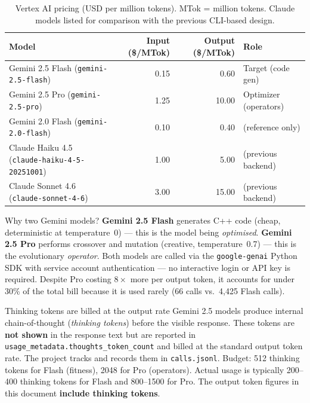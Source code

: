\documentclass[11pt,a4paper]{report}
\begin{document}
\begin{table}[h]
\centering
\begin{tabular}{@{}lrrl@{}}
\toprule
\textbf{Model} & {\textbf{Input (\$/MTok)}} & {\textbf{Output (\$/MTok)}} & \textbf{Role} \\
\midrule
Gemini 2.5 Flash (\texttt{gemini-2.5-flash}) & 0.15  & 0.60  & Target (code gen) \\
Gemini 2.5 Pro   (\texttt{gemini-2.5-pro})   & 1.25  & 10.00 & Optimizer (operators) \\
Gemini 2.0 Flash (\texttt{gemini-2.0-flash}) & 0.10  & 0.40  & (reference only) \\
\midrule
Claude Haiku 4.5 (\texttt{claude-haiku-4-5-20251001}) & 1.00 & 5.00 & (previous backend) \\
Claude Sonnet 4.6 (\texttt{claude-sonnet-4-6})         & 3.00 & 15.00 & (previous backend) \\
\bottomrule
\end{tabular}
\caption{Vertex AI pricing (USD per million tokens). MTok = million tokens.
         Claude models listed for comparison with the previous CLI-based design.}
\label{tab:standard-pricing}
\end{table}

\begin{conceptbox}{Why two Gemini models?}
\textbf{Gemini 2.5 Flash} generates C++ code (cheap, deterministic at temperature~0) ---
this is the model being \emph{optimised}.
\textbf{Gemini 2.5 Pro} performs crossover and mutation (creative, temperature~0.7) ---
this is the evolutionary \emph{operator}.
Both models are called via the \texttt{google-genai} Python SDK with service account
authentication --- no interactive login or API key is required.
Despite Pro costing $8\times$ more per output token, it accounts for under 30\% of
the total bill because it is used rarely (66 calls vs.\ 4,425 Flash calls).
\end{conceptbox}

\begin{warnbox}{Thinking tokens are billed at the output rate}
Gemini 2.5 models produce internal chain-of-thought (\emph{thinking tokens}) before
the visible response.  These tokens are \textbf{not shown} in the response text but are
reported in \texttt{usage\_metadata.thoughts\_token\_count} and billed at the standard
output token rate.  The project tracks and records them in \texttt{calls.jsonl}.
Budget: 512 thinking tokens for Flash (fitness), 2048 for Pro (operators).
Actual usage is typically 200--400 thinking tokens for Flash and 800--1500 for Pro.
The output token figures in this document \textbf{include thinking tokens}.
\end{warnbox}
\end{document}
